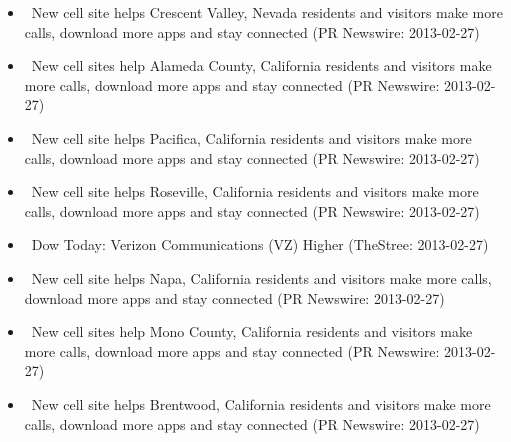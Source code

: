 \documentclass[11pt,asymmetric]{article}
\begin{document}
\begin{itemize}
\item\ New cell site helps Crescent Valley, Nevada residents and visitors make more calls, download more apps and stay connected (PR Newswire: 2013-02-27)
\item\ New cell sites help Alameda County, California residents and visitors make more calls, download more apps and stay connected (PR Newswire: 2013-02-27)
\item\ New cell site helps Pacifica, California residents and visitors make more calls, download more apps and stay connected (PR Newswire: 2013-02-27)
\item\ New cell site helps Roseville, California residents and visitors make more calls, download more apps and stay connected (PR Newswire: 2013-02-27)
\item\ Dow Today: Verizon Communications (VZ) Higher (TheStree: 2013-02-27)
\item\ New cell site helps Napa, California residents and visitors make more calls, download more apps and stay connected (PR Newswire: 2013-02-27)
\item\ New cell sites help Mono County, California residents and visitors make more calls, download more apps and stay connected (PR Newswire: 2013-02-27)
\item\ New cell site helps Brentwood, California residents and visitors make more calls, download more apps and stay connected (PR Newswire: 2013-02-27)
\end{itemize}
\end{document}
